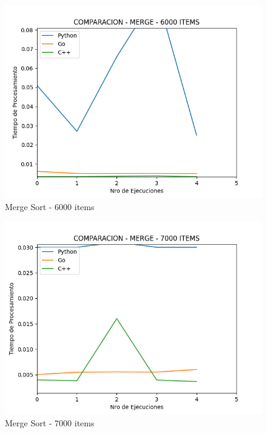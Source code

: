 \documentclass[12pt]{article} %
\begin{document}
    \begin{figure}[H]
    \centering
    \includegraphics[width=\textwidth]{merge_6000}
    \caption{Merge Sort - 6000 items}
    \end{figure}

    \vspace{5mm}
    
    \begin{figure}[H]
    \centering
    \includegraphics[width=\textwidth]{merge_7000}
    \caption{Merge Sort - 7000 items}
    \end{figure}

    \vspace{5mm}
    
\end{document}
